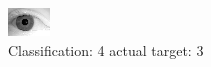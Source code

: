 \begin{figure}[h!]
\begin{center}
\includegraphics[width=0.60\columnwidth]{figures/ID2065_class_4_target_3.png}
\end{center}
\caption{ Classification: 4 actual target: 3}
\label{fig:ID2065_class_4_target_3}
\end{figure}
